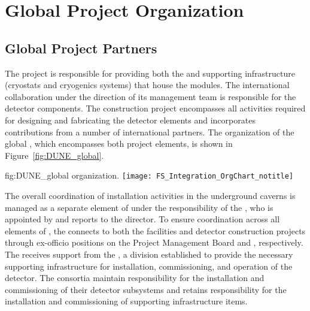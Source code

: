 \section{Global Project Organization}   %
\label{sec:exec-tc-partners}

\subsection{Global Project Partners}

The  project is responsible for providing both the
 and supporting infrastructure (cryostats and
cryogenics systems) that house the  
modules. 
The international 
collaboration under the direction of its management team is
responsible for the detector components.  The  
construction project encompasses all activities required for designing
and fabricating the detector elements and incorporates contributions
from a number of international partners.  The organization of the
global , which encompasses both project elements, is
shown in Figure~\ref{fig:DUNE_global}.

\begin{dunefigure}{fig:DUNE_global}
  { organization.}
  \texttt{[image: FS\_Integration\_OrgChart\_notitle]}
\end{dunefigure}

The overall
coordination of installation activities in the underground caverns 
is managed as a separate element of  under the
responsibility of the , who is appointed by and reports
to the  director.  To ensure coordination across
all elements of , the  connects to both
the facilities and detector construction projects through ex-officio
positions on the  Project Management Board and
 , respectively.  The  receives support from the ,
a  division established to 
provide the necessary supporting infrastructure for installation, commissioning, and operation 
of the  detector. 
The  consortia maintain responsibility 
for the installation and commissioning of their detector subsystems and 
  retains responsibility
for the installation and commissioning of supporting infrastructure
items. 

